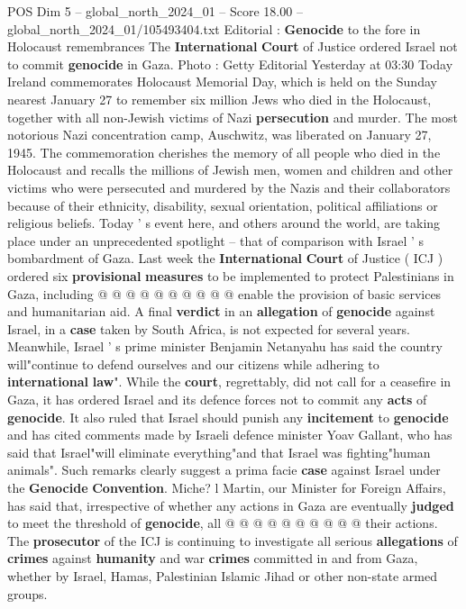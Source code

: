 \begin{textsample}{POS Dim 5 – global\_north\_2024\_01 – Score 18.00 – global\_north\_2024\_01/105493404.txt}  \label{ex:f5_pos_120}
Editorial : \textbf{Genocide} to the fore in Holocaust remembrances The \textbf{International} \textbf{Court} of Justice ordered Israel not to commit \textbf{genocide} in Gaza.
Photo : Getty Editorial Yesterday at 03:30 Today Ireland commemorates Holocaust Memorial Day, which is held on the Sunday nearest January 27 to remember six million Jews who died in the Holocaust, together with all non-Jewish victims of Nazi \textbf{persecution} and murder.
The most notorious Nazi concentration camp, Auschwitz, was liberated on January 27, 1945.
The commemoration cherishes the memory of all people who died in the Holocaust and recalls the millions of Jewish men, women and children and other victims who were persecuted and murdered by the Nazis and their collaborators because of their ethnicity, disability, sexual orientation, political affiliations or religious beliefs.
Today ' s event here, and others around the world, are taking place under an unprecedented spotlight -- that of comparison with Israel ' s bombardment of Gaza.
Last week the \textbf{International} \textbf{Court} of Justice ( ICJ ) ordered six \textbf{provisional} \textbf{measures} to be implemented to protect Palestinians in Gaza, including @ @ @ @ @ @ @ @ @ @ enable the provision of basic services and humanitarian aid.
A final \textbf{verdict} in an \textbf{allegation} of \textbf{genocide} against Israel, in a \textbf{case} taken by South Africa, is not expected for several years.
Meanwhile, Israel ' s prime minister Benjamin Netanyahu has said the country will"continue to defend ourselves and our citizens while adhering to \textbf{international} \textbf{law}".
While the \textbf{court}, regrettably, did not call for a ceasefire in Gaza, it has ordered Israel and its defence forces not to commit any \textbf{acts} of \textbf{genocide}.
It also ruled that Israel should punish any \textbf{incitement} to \textbf{genocide} and has cited comments made by Israeli defence minister Yoav Gallant, who has said that Israel"will eliminate everything"and that Israel was fighting"human animals".
Such remarks clearly suggest a prima facie \textbf{case} against Israel under the \textbf{Genocide} \textbf{Convention}.
Miche? l Martin, our Minister for Foreign Affairs, has said that, irrespective of whether any actions in Gaza are eventually \textbf{judged} to meet the threshold of \textbf{genocide}, all @ @ @ @ @ @ @ @ @ @ their actions.
The \textbf{prosecutor} of the ICJ is continuing to investigate all serious \textbf{allegations} of \textbf{crimes} against \textbf{humanity} and war \textbf{crimes} committed in and from Gaza, whether by Israel, Hamas, Palestinian Islamic Jihad or other non-state armed groups.

\end{textsample}
